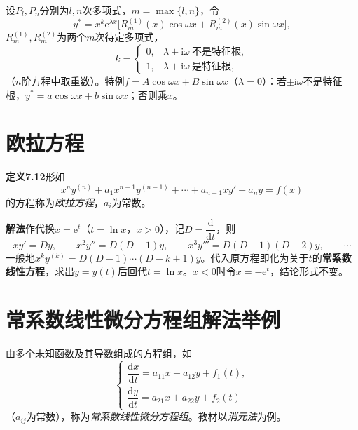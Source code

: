 \noindent 设$P_l,P_n$分别为$l,n$次多项式，$m=\max\{l,n\}$，令
\[
y^*=x^{k}\mathrm{e}^{\lambda x}\bigl[R_m^{(1)}(x)\cos\omega x+R_m^{(2)}(x)\sin\omega x\bigr],
\]
$R_m^{(1)},R_m^{(2)}$为两个$m$次待定多项式，
\[
k=\begin{cases}0, & \lambda+\mathrm{i}\omega\ \text{不是特征根},\\ 1, & \lambda+\mathrm{i}\omega\ \text{是特征根},\end{cases}
\]
（$n$阶方程中取重数）。特例$f=A\cos\omega x+B\sin\omega x$（$\lambda=0$）：若$\pm\mathrm{i}\omega$不是特征根，$y^*=a\cos\omega x+b\sin\omega x$；否则乘$x$。



\section{欧拉方程}

\noindent\textbf{定义7.12}\quad 形如
\[
x^ny^{(n)}+a_1x^{n-1}y^{(n-1)}+\cdots+a_{n-1}xy'+a_ny=f(x)
\]
的方程称为\emph{欧拉方程}，$a_i$为常数。

\noindent\textbf{解法}\quad 作代换$x=\mathrm{e}^{t}$（$t=\ln x$，$x>0$），记$D=\dfrac{\mathrm{d}}{\mathrm{d}t}$，则
\[
xy'=Dy,\qquad x^2y''=D(D-1)y,\qquad x^3y'''=D(D-1)(D-2)y,\qquad\cdots
\]
一般地$x^ky^{(k)}=D(D-1)\cdots(D-k+1)y$。代入原方程即化为关于$t$的\textbf{常系数线性方程}，求出$y=y(t)$后回代$t=\ln x$。$x<0$时令$x=-\mathrm{e}^t$，结论形式不变。



\section{常系数线性微分方程组解法举例}

\noindent 由多个未知函数及其导数组成的方程组，如
\[
\begin{cases}
\dfrac{\mathrm{d}x}{\mathrm{d}t}=a_{11}x+a_{12}y+f_1(t),\\[6pt]
\dfrac{\mathrm{d}y}{\mathrm{d}t}=a_{21}x+a_{22}y+f_2(t)
\end{cases}
\]
（$a_{ij}$为常数），称为\emph{常系数线性微分方程组}。教材以\emph{消元法}为例。

